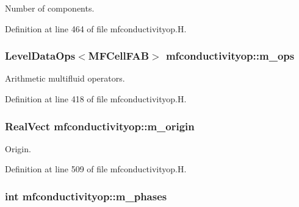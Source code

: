 Number of components. 



Definition at line 464 of file mfconductivityop.\+H.

\subsubsection[{\texorpdfstring{m\+\_\+ops}{m_ops}}]{\setlength{\rightskip}{0pt plus 5cm}Level\+Data\+Ops$<$M\+F\+Cell\+F\+AB$>$ mfconductivityop\+::m\+\_\+ops\hspace{0.3cm}{\ttfamily [protected]}}\hypertarget{classmfconductivityop_a5cb617af2cd3c9bc89143308251c2451}{}\label{classmfconductivityop_a5cb617af2cd3c9bc89143308251c2451}


Arithmetic multifluid operators. 



Definition at line 418 of file mfconductivityop.\+H.

\subsubsection[{\texorpdfstring{m\+\_\+origin}{m_origin}}]{\setlength{\rightskip}{0pt plus 5cm}Real\+Vect mfconductivityop\+::m\+\_\+origin\hspace{0.3cm}{\ttfamily [protected]}}\hypertarget{classmfconductivityop_abe60c58d994c4ff79a8621418b2e7141}{}\label{classmfconductivityop_abe60c58d994c4ff79a8621418b2e7141}


Origin. 



Definition at line 509 of file mfconductivityop.\+H.

\subsubsection[{\texorpdfstring{m\+\_\+phases}{m_phases}}]{\setlength{\rightskip}{0pt plus 5cm}int mfconductivityop\+::m\+\_\+phases\hspace{0.3cm}{\ttfamily [protected]}}\hypertarget{classmfconductivityop_aafdf99ae10b89727afa1a4b2d76fd946}{}\label{classmfconductivityop_aafdf99ae10b89727afa1a4b2d76fd946}


